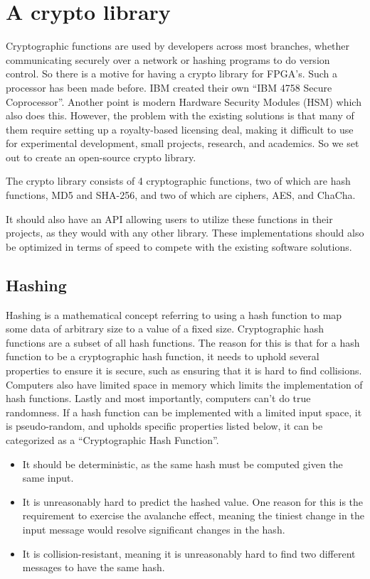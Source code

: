 \documentclass[a4paper, openany]{book}
\begin{document}
\section{A crypto library}
\label{sec:org2be63b7}
Cryptographic functions are used by developers across most branches, whether communicating securely over a network or hashing programs to do version control.
So there is a motive for having a crypto library for FPGA's. Such a processor has been made before. IBM created their own ``IBM 4758 Secure Coprocessor''\cite{IBM4758}. Another point is modern Hardware Security Modules (HSM) which also does this.
However, the problem with the existing solutions is that many of them require setting up a royalty-based licensing deal, making it difficult to use for experimental development, small projects, research, and academics.
So we set out to create an open-source crypto library.

The crypto library consists of 4 cryptographic functions, two of which are hash functions, MD5 and SHA-256, and two of which are ciphers, AES, and ChaCha.

It should also have an API allowing users to utilize these functions in their projects, as they would with any other library.
These implementations should also be optimized in terms of speed to compete with the existing software solutions.

\subsection{Hashing}
\label{sec:org001984e}
Hashing is a mathematical concept referring to using a hash function to map some data of arbitrary size to a value of a fixed size. Cryptographic hash functions are a subset of all hash functions.
The reason for this is that for a hash function to be a cryptographic hash function, it needs to uphold several properties to ensure it is secure, such as ensuring that it is hard to find collisions. Computers also have limited space in memory which limits the implementation of hash functions. Lastly and most importantly, computers can't do true randomness.
If a hash function can be implemented with a limited input space, it is pseudo-random, and upholds specific properties listed below, it can be categorized as a ``Cryptographic Hash Function''.
\begin{itemize}
\item It should be deterministic, as the same hash must be computed given the same input.
\item It is unreasonably hard to predict the hashed value. One reason for this is the requirement to exercise the avalanche effect, meaning the tiniest change in the input message would resolve significant changes in the hash.
\item It is collision-resistant, meaning it is unreasonably hard to find two different messages to have the same hash.
\end{itemize}
\end{document}

